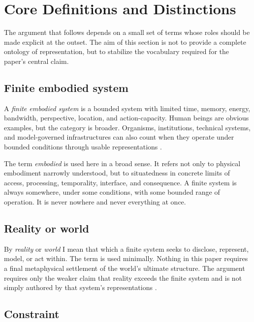 \documentclass[11pt]{article}
\renewcommand{\emph}[1]{\textit{#1}}
\begin{document}
\section{Core Definitions and Distinctions}

The argument that follows depends on a small set of terms whose roles should be made explicit at the outset. The aim of this section is not to provide a complete ontology of representation, but to stabilize the vocabulary required for the paper's central claim.

\subsection{Finite embodied system}

A \emph{finite embodied system} is a bounded system with limited time, memory, energy, bandwidth, perspective, location, and action-capacity. Human beings are obvious examples, but the category is broader. Organisms, institutions, technical systems, and model-governed infrastructures can also count when they operate under bounded conditions through usable representations \cite{Wheeler2024BoundedRationalitySEP,Simon1982ModelsBoundedRationality}.

The term \emph{embodied} is used here in a broad sense. It refers not only to physical embodiment narrowly understood, but to situatedness in concrete limits of access, processing, temporality, interface, and consequence. A finite system is always somewhere, under some conditions, with some bounded range of operation. It is never nowhere and never everything at once.

\subsection{Reality or world}

By \emph{reality} or \emph{world} I mean that which a finite system seeks to disclose, represent, model, or act within. The term is used minimally. Nothing in this paper requires a final metaphysical settlement of the world's ultimate structure. The argument requires only the weaker claim that reality exceeds the finite system and is not simply authored by that system's representations \cite{Chakravartty2011ScientificRealismSEP}.

\subsection{Constraint}
\end{document}
